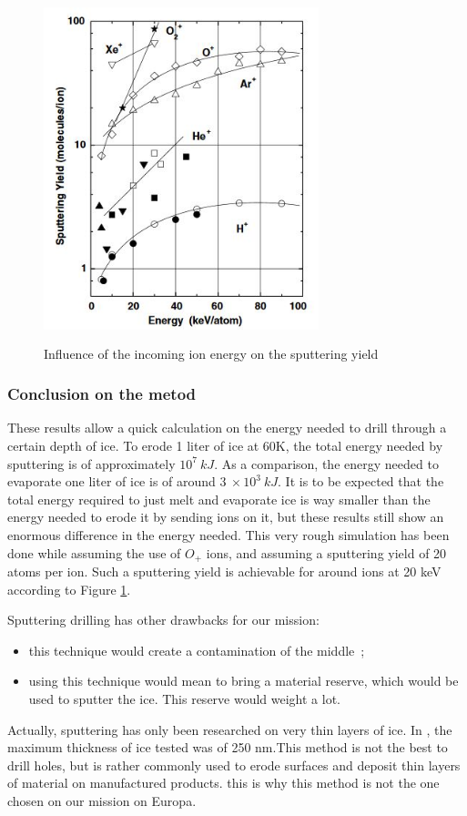 \begin{figure}[htb]
\centering
\includegraphics[width=8cm, height=10cm, clip]{Paul/sputteringenergy.JPG}
\caption{Influence of the incoming ion energy on the sputtering yield}
\label{sputteringenergy}
\end{figure}


\subsubsection{Conclusion on the metod}

These results allow a quick calculation on the energy needed to drill through a certain depth of ice. To erode 1 liter of ice at 60K, the total energy needed by sputtering is of approximately $10^{7}~kJ$. As a comparison, the energy needed to evaporate one liter of ice is of around $3~\times10^{3}~kJ$. It is to be expected that the total energy required to just melt and evaporate ice is way smaller than the energy needed to erode it by sending ions on it, but these results still show an enormous difference in the energy needed. This very rough simulation has been done while assuming the use of $O_{+}$ ions, and assuming a sputtering yield of 20 atoms per ion. Such a sputtering yield is achievable for around ions at 20 keV according to Figure \ref{sputteringenergy}.

Sputtering drilling has other drawbacks for our mission:
\begin{itemize}
\item{this technique would create a contamination of the middle~;}
\item{using this technique would mean to bring a material reserve, which would be used to sputter the ice. This reserve would weight a lot.}
\end{itemize}

Actually, sputtering has only been researched on very thin layers of ice. In \cite{baragiola2003sputtering}, the maximum thickness of ice tested was of 250 nm.This method is not the best to drill holes, but is rather commonly used to erode surfaces and deposit thin layers of material on manufactured products. this is why this method is not the one chosen on our mission on Europa.